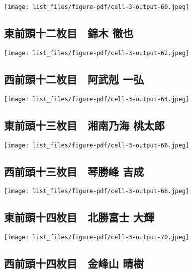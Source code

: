 \documentclass[
]{bxjsarticle}
\begin{document}
\texttt{[image: list\_files/figure-pdf/cell-3-output-60.jpeg]}

\subsection{東前頭十二枚目　錦木
徹也}\label{ux6771ux524dux982dux5341ux4e8cux679aux76ee-ux9326ux6728-ux5fb9ux4e5f}

\texttt{[image: list\_files/figure-pdf/cell-3-output-62.jpeg]}

\subsection{西前頭十二枚目　阿武剋
一弘}\label{ux897fux524dux982dux5341ux4e8cux679aux76ee-ux963fux6b66ux524b-ux4e00ux5f18}

\texttt{[image: list\_files/figure-pdf/cell-3-output-64.jpeg]}

\subsection{東前頭十三枚目　湘南乃海
桃太郎}\label{ux6771ux524dux982dux5341ux4e09ux679aux76ee-ux6e58ux5357ux4e43ux6d77-ux6843ux592aux90ce}

\texttt{[image: list\_files/figure-pdf/cell-3-output-66.jpeg]}

\subsection{西前頭十三枚目　琴勝峰
吉成}\label{ux897fux524dux982dux5341ux4e09ux679aux76ee-ux7434ux52ddux5cf0-ux5409ux6210}

\texttt{[image: list\_files/figure-pdf/cell-3-output-68.jpeg]}

\subsection{東前頭十四枚目　北勝富士
大輝}\label{ux6771ux524dux982dux5341ux56dbux679aux76ee-ux5317ux52ddux5bccux58eb-ux5927ux8f1d}

\texttt{[image: list\_files/figure-pdf/cell-3-output-70.jpeg]}

\subsection{西前頭十四枚目　金峰山
晴樹}\label{ux897fux524dux982dux5341ux56dbux679aux76ee-ux91d1ux5cf0ux5c71-ux6674ux6a39}
\end{document}

